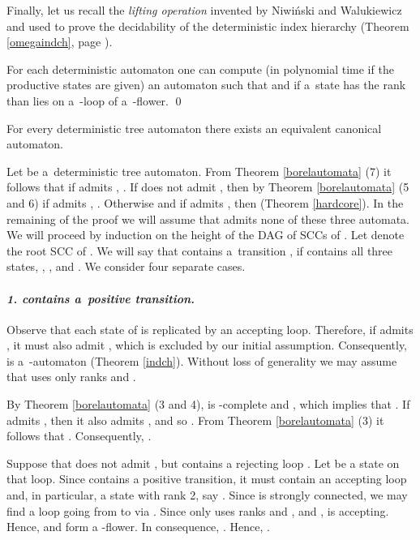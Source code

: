 \documentclass{LMCS}
\begin{document}
Finally, let us recall the {\em lifting operation}  invented by Niwi\'nski and Walu\-kiewicz and used to prove the decidability of the deterministic index hierarchy (Theorem \ref{omegaindch}, page \pageref{omegaindch}). 

\begin{lem} \label{lifting} 
For each deterministic automaton  one can compute (in polynomial time if the productive states are given) an automaton  such that  and if a~state  has the rank  than  lies on a~-loop of a~-flower. \qed
\end{lem}


\begin{thm} \label{completeness}
For every deterministic tree automaton there exists an equivalent canonical automaton.
\end{thm}

\proof Let  be a~deterministic tree automaton. From Theorem \ref{borelautomata} (7) it follows that if  admits , . If  does not admit , then by Theorem \ref{borelautomata} (5 and 6) if  admits , . Otherwise  and if  admits , then  (Theorem \ref{hardcore}). In the remaining of the proof we will assume that  admits none of these three automata. We will proceed by induction on the height of the DAG of SCCs of . Let  denote the root SCC of . We will say that  contains a~transition , if  contains all three states,  , , and . We consider four separate cases.

\paragraph{{\em 1.   contains a~positive transition.}} Observe that each state of  is replicated by an accepting loop. Therefore, if  admits , it must also admit , which is excluded by our initial assumption. Consequently,  is a~-automaton (Theorem \ref{indch}). Without loss of generality we may assume that  uses only ranks  and .

By Theorem \ref{borelautomata} (3 and 4),  is -complete and , which implies that . If  admits , then it also admits , and so . From Theorem \ref{borelautomata} (3) it follows that . Consequently, .

Suppose that  does not admit , but  contains a rejecting loop . Let  be a state on that loop. Since  contains a positive transition, it must contain an accepting loop and, in particular, a state with rank 2, say . Since  is strongly connected, we may find a loop  going from  to  via . Since  only uses ranks  and , and ,  is accepting. Hence,  and  form a -flower. In consequence, .  Hence, . 
\end{document}
